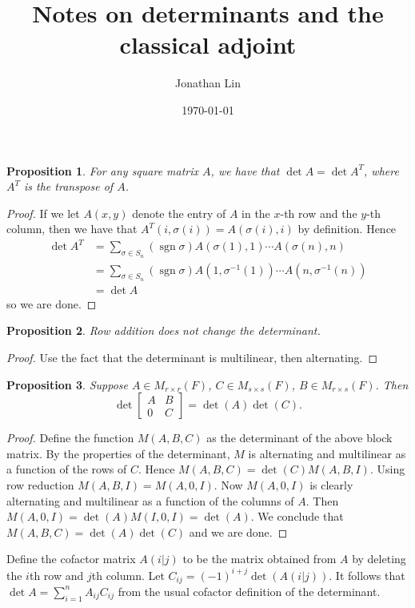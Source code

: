 \documentclass[12pt]{article}
\title{Notes on determinants and the classical adjoint}
\author{Jonathan Lin}
\date{\today}
\theoremstyle{plain}
\newtheorem{prop}{Proposition}
\theoremstyle{definition}
\newcommand{\sgn}{\operatorname{sgn}}
\begin{document}
\maketitle

\begin{prop}
For any square matrix $A$, we have that $\det{A} = \det{A^T}$, where $A^T$ is the transpose of $A$.
\end{prop}
\begin{proof}
If we let $A(x, y)$ denote the entry of $A$ in the $x$-th row and the $y$-th column, then we have that $A^T(i, \sigma(i)) = A(\sigma(i), i)$ by definition. Hence
\begin{align*}
	\det{A^T} &= \sum_{\sigma \in S_n}(\sgn{\sigma})A(\sigma(1), 1)\cdots A(\sigma(n), n) \\
		&= \sum_{\sigma \in S_n}(\sgn{\sigma})A(1, \sigma^{-1}(1))\cdots A(n, \sigma^{-1}(n)) \\
		&= \det{A}
\end{align*}
so we are done.
\end{proof}

\begin{prop}
Row addition does not change the determinant.
\end{prop}
\begin{proof}
Use the fact that the determinant is multilinear, then alternating.
\end{proof}

\begin{prop}
Suppose $A \in M_{r \times r}(F)$, $C \in M_{s \times s}(F)$, $B \in M_{r \times s}(F)$. Then
\[\det \begin{bmatrix} A & B \\ 0 & C\end{bmatrix} = \det(A)\det(C).\]
\end{prop}
\begin{proof}
	Define the function $M(A, B, C)$ as the determinant of the above block matrix. By the properties of the determinant, $M$ is alternating and multilinear as a function of the rows of $C$. Hence $M(A, B, C) = \det(C)M(A, B, I)$. Using row reduction $M(A, B, I) = M(A, 0, I)$. Now $M(A, 0, I)$ is clearly alternating and multilinear as a function of the columns of $A$. Then $M(A, 0, I) = \det(A)M(I, 0, I) = \det(A)$. We conclude that $M(A, B, C) = \det(A)\det(C)$ and we are done.
\end{proof}

Define the cofactor matrix $A(i | j)$ to be the matrix obtained from $A$ by deleting the $i$th row and $j$th column. Let $C_{ij} = (-1)^{i + j}\det(A(i|j))$. It follows that $\det{A} = \sum_{i = 1}^n A_{ij}C_{ij}$ from the usual cofactor definition of the determinant.
\end{document}
